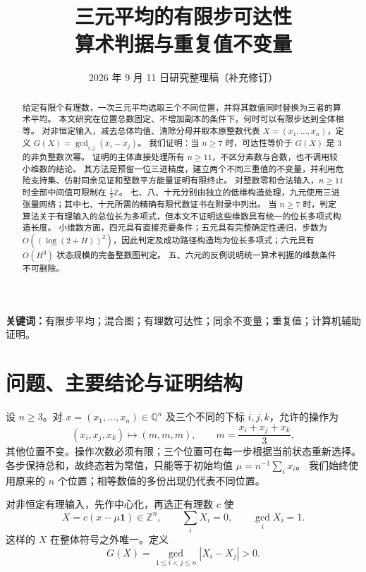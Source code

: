 \documentclass[UTF8,fontset=fandol,zihao=-4,a4paper]{ctexart}
\title{\heiti 三元平均的有限步可达性\\[0.3em]
  \large 算术判据与重复值不变量}
\author{}
\date{2026 年 9 月 11 日\quad 研究整理稿（补充修订）}
\numberwithin{equation}{section}
\theoremstyle{definition}
\newcommand{\Z}{\mathbb Z}
\newcommand{\Q}{\mathbb Q}
\newcommand{\one}{\boldsymbol 1}
\begin{document}
\maketitle
\thispagestyle{plain}
\begin{abstract}
给定有限个有理数，一次三元平均选取三个不同位置，并将其数值同时替换为三者的算术平均。
本文研究在位置总数固定、不增加副本的条件下，何时可以有限步达到全体相等。
对非恒定输入，减去总体均值、清除分母并取本原整数代表
$X=(x_1,\ldots,x_n)$，定义 $G(X)=\gcd_{i,j}(x_i-x_j)$。
我们证明：当 $n\ge7$ 时，可达性等价于 $G(X)$ 是 $3$ 的非负整数次幂。
证明的主体直接处理所有 $n\ge11$，不区分素数与合数，也不调用较小维数的结论。
其方法是预留一位三进精度，建立两个不同三重值的不变量，并利用危险支持集、仿射同余见证和整数平方能量证明有限终止。
对整数零和合法输入，$n\ge11$ 时全部中间值可限制在 $\frac13\Z$。
七、八、十元分别由独立的低维构造处理，九元使用三进张量网络；其中七、十元所需的精确有限代数证书在附录中列出。
当 $n\ge7$ 时，判定算法关于有理输入的总位长为多项式，但本文不证明这些维数具有统一的位长多项式构造长度。
小维数方面，四元具有直接充要条件；五元具有完整确定性递归，步数为 $O((\log(2+H))^2)$，因此判定及成功路径构造均为位长多项式；六元具有 $O(H^3)$ 状态规模的完备整数图判定。
五、六元的反例说明统一算术判据的维数条件不可删除。
\end{abstract}
\noindent\textbf{关键词：}有限步平均；混合图；有理数可达性；同余不变量；重复值；计算机辅助证明。

\tableofcontents
\newpage

\section{问题、主要结论与证明结构}

设 $n\ge3$。对 $x=(x_1,\ldots,x_n)\in\Q^n$ 及三个不同的下标
$i,j,k$，允许的操作为
\begin{equation}\label{eq:atom}
 (x_i,x_j,x_k)\longmapsto(m,m,m),\qquad
 m=\frac{x_i+x_j+x_k}{3},
\end{equation}
其他位置不变。操作次数必须有限；三个位置可在每一步根据当前状态重新选择。
各步保持总和，故终态若为常值，只能等于初始均值
$\mu=n^{-1}\sum_i x_i$。
我们始终使用原来的 $n$ 个位置；相等数值的多份出现仍代表不同位置。

对非恒定有理输入，先作中心化，再选正有理数 $c$ 使
\begin{equation}\label{eq:normalization}
 X=c(x-\mu\one)\in\Z^n,\qquad
 \sum_i X_i=0,\qquad \gcd_i X_i=1.
\end{equation}
这样的 $X$ 在整体符号之外唯一。定义
\begin{equation}\label{eq:G}
 G(X)=\gcd_{1\le i<j\le n}|X_i-X_j|>0.
\end{equation}
\end{document}
